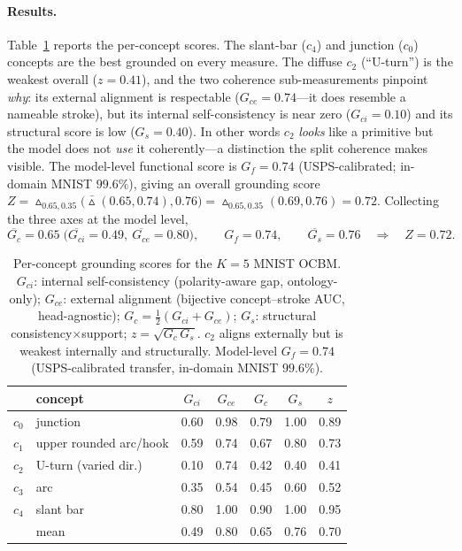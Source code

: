 \paragraph{Results.}
Table~\ref{tab:grounding} reports the per-concept scores. The slant-bar ($c_4$) and
junction ($c_0$) concepts are the best grounded on every measure. The diffuse $c_2$
(``U-turn'') is the weakest overall ($z{=}0.41$), and the two coherence
sub-measurements pinpoint \emph{why}: its external alignment is respectable
($G_{ce}{=}0.74$---it does resemble a nameable stroke), but its internal
self-consistency is near zero ($G_{ci}{=}0.10$) and its structural score is low
($G_s{=}0.40$). In other words $c_2$ \emph{looks} like a primitive but the model does
not \emph{use} it coherently---a distinction the split coherence makes visible. The
model-level functional score is $G_f=0.74$ (USPS-calibrated; in-domain MNIST
$99.6\%$), giving an overall grounding score
$Z=\vartriangle_{\!0.65,0.35}\!\big(\bar\vartriangle(0.65,0.74),0.76\big)=\vartriangle_{\!0.65,0.35}(0.69,0.76)=0.72$.
Collecting the three axes at the model level,
\begin{equation}
\overline{G_c}=0.65\;\big(\overline{G_{ci}}=0.49,\ \overline{G_{ce}}=0.80\big),\qquad
G_f=0.74,\qquad \overline{G_s}=0.76
\quad\Longrightarrow\quad Z=0.72 .
\end{equation}

\begin{table}[t]
\centering
\caption{Per-concept grounding scores for the $K{=}5$ MNIST OCBM.
$G_{ci}$: internal self-consistency (polarity-aware gap, ontology-only);
$G_{ce}$: external alignment (bijective concept--stroke AUC, head-agnostic);
$G_c=\tfrac12(G_{ci}{+}G_{ce})$; $G_s$: structural consistency$\times$support;
$z=\sqrt{G_c\,G_s}$. $c_2$ aligns externally but is weakest internally and
structurally. Model-level $G_f=0.74$ (USPS-calibrated transfer, in-domain MNIST
$99.6\%$).}
\label{tab:grounding}
\small
\begin{tabular}{llccccc}
\toprule
& concept & $G_{ci}$ & $G_{ce}$ & $G_c$ & $G_s$ & $z$ \\
\midrule
$c_0$ & junction            & 0.60 & 0.98 & 0.79 & 1.00 & 0.89 \\
$c_1$ & upper rounded arc/hook & 0.59 & 0.74 & 0.67 & 0.80 & 0.73 \\
$c_2$ & U-turn (varied dir.) & 0.10 & 0.74 & 0.42 & 0.40 & 0.41 \\
$c_3$ & arc                 & 0.35 & 0.54 & 0.45 & 0.60 & 0.52 \\
$c_4$ & slant bar           & 0.80 & 1.00 & 0.90 & 1.00 & 0.95 \\
\midrule
& mean                       & 0.49 & 0.80 & 0.65 & 0.76 & 0.70 \\
\bottomrule
\end{tabular}
\end{table}

